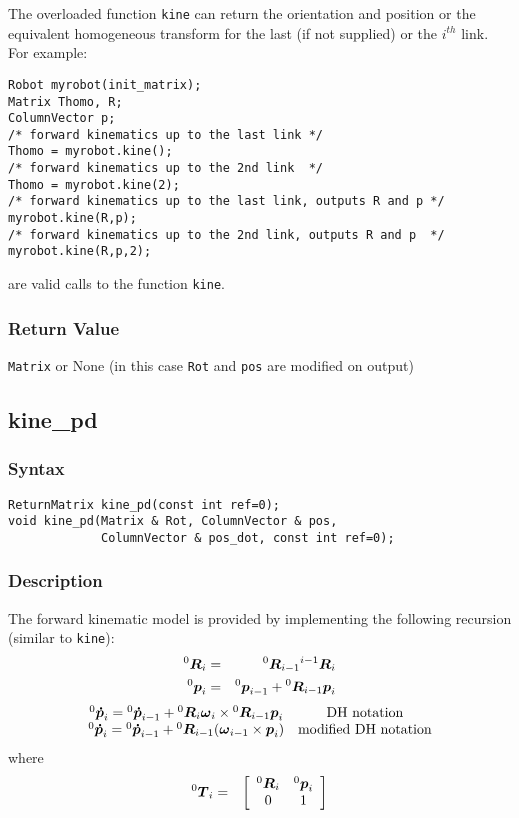 \documentclass[dvips,11pt,fleqn]{report}
\newcommand{\mbold}[1]{\mbox{\boldmath $ #1 $}}
\newcommand{\matr}[2]{\left[\begin{array}{#1} #2 \end{array}\right]}
\begin{document}
The overloaded function {\tt kine} can return the orientation and position or 
the equivalent homogeneous transform for the last (if not supplied) or the $i^{th}$
link. For example: 
\begin{verbatim}
Robot myrobot(init_matrix);
Matrix Thomo, R;
ColumnVector p;
/* forward kinematics up to the last link */
Thomo = myrobot.kine();  
/* forward kinematics up to the 2nd link  */
Thomo = myrobot.kine(2); 
/* forward kinematics up to the last link, outputs R and p */
myrobot.kine(R,p);       
/* forward kinematics up to the 2nd link, outputs R and p  */
myrobot.kine(R,p,2);     
\end{verbatim}
\noindent are valid calls to the function {\tt kine}.


\subsubsection*{Return Value}

{\tt Matrix} or None (in this case {\tt Rot} and {\tt pos} are modified on output)

\newpage

\subsection*{kine\_pd}
\subsubsection*{Syntax}
\begin{verbatim}
ReturnMatrix kine_pd(const int ref=0);
void kine_pd(Matrix & Rot, ColumnVector & pos, 
             ColumnVector & pos_dot, const int ref=0);
\end{verbatim}
\subsubsection*{Description}   
The forward kinematic model is provided by implementing 
the following recursion (similar to \texttt{kine}):
\begin{eqnarray}
{}^0 \mbold{R}_i & = & {}^0 \mbold{R}_{i-1} {}^{i-1}\mbold{R}_i \\
{}^0 \mbold{p}_i & = & {}^0 \mbold{p}_{i-1} + {}^0 \mbold{R}_{i-1}
\mbold{p}_i 
\end{eqnarray}
\begin{eqnarray}
 \begin{array}{cc}
  {}^0 \mbold{\dot{p}}_i = {}^0 \mbold{\dot{p}}_{i-1} + {}^0
  \mbold{R}_i \mbold{\omega}_i \times {}^0 \mbold{R}_{i-1} \mbold{p}_i & \textrm{DH notation} \\
  {}^0 \mbold{\dot{p}}_i = {}^0 \mbold{\dot{p}}_{i-1} + {}^0
  \mbold{R}_{i-1} (\mbold{\omega}_{i-1} \times \mbold{p}_i) & \textrm{modified DH notation}
 \end{array}
\end{eqnarray}
where
\begin{eqnarray}
{}^0 \mbold{T}_i & = & \matr{cc}{
{}^0 \mbold{R}_{i} & {}^0 \mbold{p}_i \\
0 & 1 }
\end{eqnarray}
\end{document}
